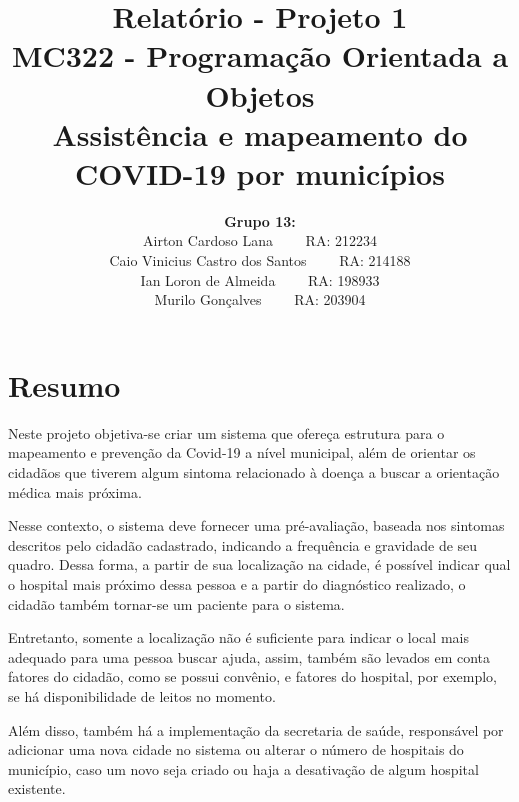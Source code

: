 \documentclass[10pt]{article}
\begin{document}
\title{Relatório - Projeto 1\\
 	   MC322 - Programação Orientada a Objetos\\
 	   \textbf{Assistência e mapeamento do COVID-19 por municípios}
}
 	   
\author{\textbf{Grupo 13:}\\
		Airton Cardoso Lana \ \ \ \ RA: 212234\\
		Caio Vinicius Castro dos Santos \ \ \ \ RA: 214188\\
		Ian Loron de Almeida \ \ \ \ RA: 198933\\
		Murilo Gonçalves \ \ \ \ RA: 203904\\
}
\date{}

\maketitle

\section{Resumo}
\hspace{2em} Neste projeto objetiva-se criar um sistema que ofereça estrutura para o mapeamento e prevenção da Covid-19 a nível municipal, além de orientar os cidadãos que tiverem algum sintoma relacionado à doença a buscar a orientação médica mais próxima. 

\hspace{2em} Nesse contexto, o sistema deve fornecer uma pré-avaliação, baseada nos sintomas descritos pelo cidadão cadastrado, indicando a frequência e gravidade de seu quadro. Dessa forma, a partir de sua localização na cidade, é possível indicar qual o hospital mais próximo dessa pessoa e a partir do diagnóstico realizado, o cidadão também tornar-se um paciente para o sistema.

\hspace{2em} Entretanto, somente a localização não é suficiente para indicar o local mais adequado para uma pessoa buscar ajuda, assim, também são levados em conta fatores do cidadão, como se possui convênio, e fatores do hospital, por exemplo, se há disponibilidade de leitos no momento.

\hspace{2em} Além disso, também há a implementação da secretaria de saúde, responsável por adicionar uma nova cidade no sistema ou alterar o número de hospitais do município, caso um novo seja criado ou haja a desativação de algum hospital existente.
\end{document}
